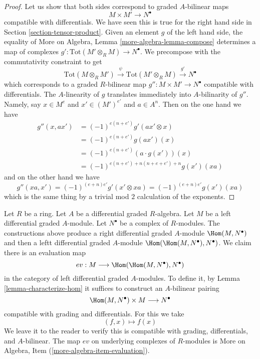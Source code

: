 \begin{proof}
Let us show that both sides correspond to graded $A$-bilinear maps
$$
M \times M' \longrightarrow N^\bullet
$$
compatible with differentials. We have seen this is true for the right
hand side in Section \ref{section-tensor-product}. Given an element
$g$ of the left hand side, the equality of
More on Algebra, Lemma \ref{more-algebra-lemma-compose}
determines a map of complexes
$g' : \text{Tot}(M' \otimes_R M) \to N^\bullet$.
We precompose with the commutativity constraint to get
$$
\text{Tot}(M \otimes_R M') \xrightarrow{\psi}
\text{Tot}(M' \otimes_R M) \xrightarrow{g'}
N^\bullet
$$
which corresponds to a graded $R$-bilinear
map $g'' : M \times M' \to N^\bullet$ compatible with differentials.
The $A$-linearity of $g$ translates immediately into $A$-bilinarity of $g''$.
Namely, say $x \in M^e$ and $x' \in (M')^{e'}$ and $a \in A^n$. Then
on the one hand we have
\begin{align*}
g''(x, ax')
& =
(-1)^{e(n + e')} g'(ax' \otimes x) \\
& =
(-1)^{e(n + e')} g(ax')(x) \\
& =
(-1)^{e(n + e')} (a \cdot g(x'))(x) \\
& =
(-1)^{e(n + e') + n(n + e + e') + n} g(x')(xa)
\end{align*}
and on the other hand we have
$$
g''(xa, x') = (-1)^{(e + n)e'} g'(x' \otimes xa) =
(-1)^{(e + n)e'} g(x')(xa) 
$$
which is the same thing by a trivial mod $2$ calculation of the exponents.
\end{proof}

\begin{remark}
\label{remark-evaluation-map-left}
Let $R$ be a ring. Let $A$ be a differential graded $R$-algebra.
Let $M$ be a left differential graded $A$-module. Let
$N^\bullet$ be a complex of $R$-modules. The constructions above
produce a right differential graded $A$-module $\Hom(M, N^\bullet)$
and then a leftt differential graded $A$-module
$\Hom(\Hom(M, N^\bullet), N^\bullet)$. We claim there is an
evaluation map
$$
ev : M \longrightarrow \Hom(\Hom(M, N^\bullet), N^\bullet)
$$
in the category of left differential graded $A$-modules. To define it, by
Lemma \ref{lemma-characterize-hom} it suffices to construct an
$A$-bilinear pairing
$$
\Hom(M, N^\bullet) \times M \longrightarrow N^\bullet
$$
compatible with grading and differentials. For this we take
$$
(f, x) \longmapsto f(x)
$$
We leave it to the reader to verify this is compatible with grading,
differentials, and $A$-bilinear. The map $ev$ on underlying complexes
of $R$-modules is More on Algebra, Item (\ref{more-algebra-item-evaluation}).
\end{remark}

